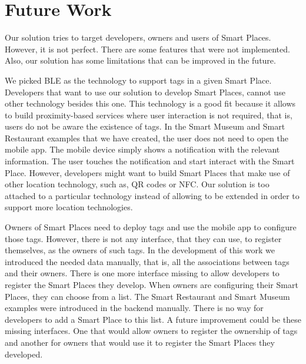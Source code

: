 \section{Future Work}
\label{sec:conclusion_future_work}
Our solution tries to target developers, owners and users of Smart Places.
However, it is not perfect.
There are some features that were not implemented. Also, our solution has some limitations that can be improved in the future.

We picked \gls{BLE} as the technology to support tags in a given Smart Place.
Developers that want to use our solution to develop Smart Places, cannot use other technology besides this one.
This technology is a good fit because it allows to build proximity-based services where user interaction is not required, that is, users do not be aware the existence of tags.
In the Smart Museum and Smart Restaurant examples that we have created, the user does not need to open the mobile app.
The mobile device simply shows a notification with the relevant information. The user touches the notification and start interact with the Smart Place.
However, developers might want to build Smart Places that make use of other location technology, such as, \gls{QR} codes or \gls{NFC}.
Our solution is too attached to a particular technology instead of allowing to be extended in order to support more location technologies.

Owners of Smart Places need to deploy tags and use the mobile app to configure those tags.
However, there is not any interface, that they can use, to register themselves, as the owners of such tags.
In the development of this work we introduced the needed data manually, that is,
all the associations between tags and their owners.
There is one more interface missing to allow developers to register the Smart Places they develop.
When owners are configuring their Smart Places, they can choose from a list.
The Smart Restaurant and Smart Museum examples were introduced in the backend manually.
There is no way for developers to add a Smart Place to this list.
A future improvement could be these missing interfaces.
One that would allow owners to register the ownership of tags and another for owners that would use it to register the Smart Places they developed.

